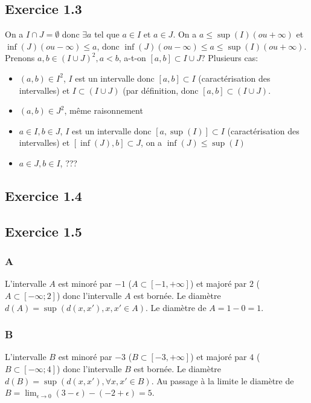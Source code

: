 \documentclass[]{book}
\theoremstyle{definition}
\begin{document}
\subsection*{Exercice 1.3}

On a $I \cap J = \emptyset$ donc $\exists a$ tel que $a \in I$ et $a \in J$. On a $a \leq \sup(I) (ou +\infty)$ et $\inf(J) (ou -\infty) \leq a$, donc $\inf(J) (ou -\infty) \leq a \leq \sup(I) (ou +\infty)$.\\

Prenons $a,b \in (I \cup J)^2, a < b$, a-t-on $[a,b] \subset I \cup J$? 
Plusieurs cas:
\begin{itemize}
\item $(a,b) \in I^2$, $I$ est un intervalle donc $[a,b] \subset I$ (caract\'erisation des intervalles) et $I \subset (I \cup J)$ (par d\'efinition, donc $[a,b] \subset (I \cup J)$.
\item $(a,b) \in J^2$, m\^eme raisonnement 
\item $a \in I, b \in J$, $I$ est un intervalle donc $[a,\sup(I)] \subset I$ (caract\'erisation des intervalles) et $[\inf(J),b] \subset J$, on a $\inf(J) \leq \sup(I)$ 
\item $a \in J, b \in I$, ???
\end{itemize}


\subsection*{Exercice 1.4}


\subsection*{Exercice 1.5} 
\subsubsection*{A}
L'intervalle $A$ est minor\'e par $-1$ ($A \subset [-1,+\infty]$) et major\'e par $2$ ($A \subset [-\infty; 2]$) donc l'intervalle $A$ est born\'ee. Le diam\`etre $d(A) = \sup(d(x,x'),x,x' \in A)$. Le diam\`etre de $A = 1-0 = 1$.

\subsubsection*{B}
L'intervalle $B$ est minor\'e par $-3$ ($B \subset [-3,+\infty]$) et major\'e par $4$ ($B \subset [-\infty; 4]$) donc l'intervalle $B$ est born\'ee. Le diam\`etre $d(B) = \sup(d(x,x'), \forall x,x' \in B)$. Au passage \`a la limite le diam\`etre de $B = \lim_{\epsilon \to 0} (3-\epsilon)-(-2+\epsilon) = 5$.
\end{document}
